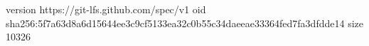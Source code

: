 version https://git-lfs.github.com/spec/v1
oid sha256:5f7a63d8a6d15644ee3c9cf5133ea32c0b55c34daeeae33364fed7fa3dfdde14
size 10326

